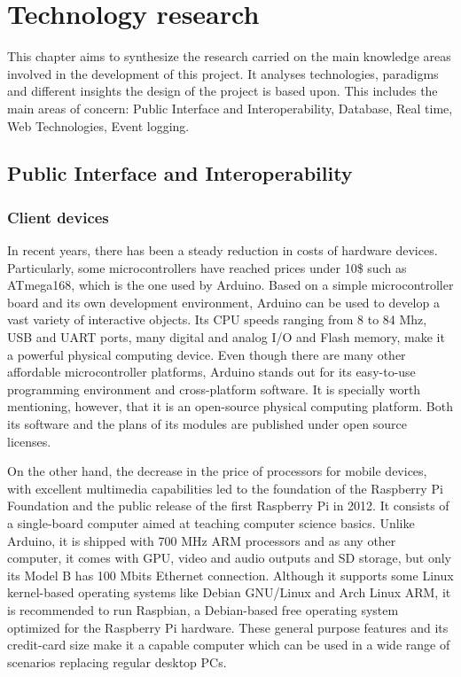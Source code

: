 \chapter{Technology research}

This chapter aims to synthesize the research carried on the main knowledge areas involved in the development of this project. It analyses technologies, paradigms and different insights the design of the project is based upon. This includes the main areas of concern: Public Interface and Interoperability, Database, Real time, Web Technologies, Event logging.   

\section{Public Interface and Interoperability}

\subsection{Client devices}

In recent years, there has been a steady reduction in costs of hardware devices. Particularly, some microcontrollers have reached prices under 10\$ such as ATmega168, which is the one used by Arduino. Based on a simple microcontroller board and its own development environment, Arduino can be used to develop a vast variety of interactive objects. Its CPU speeds ranging from 8 to 84 Mhz, USB and UART ports, many digital and analog I/O and Flash memory, make it a powerful physical computing device. Even though there are many other affordable microcontroller platforms, Arduino stands out for its easy-to-use programming environment and cross-platform software. It is specially worth mentioning, however, that it is an open-source physical computing platform. Both its software and the plans of its modules are published under open source licenses.

On the other hand, the decrease in the price of processors for mobile devices, with excellent multimedia capabilities led to the foundation of the Raspberry Pi Foundation and the public release of the first Raspberry Pi in 2012. It consists of a single-board computer aimed at teaching computer science basics. Unlike Arduino, it is shipped with 700 MHz ARM processors and as any other computer, it comes with GPU, video and audio outputs and SD storage, but only its Model B has 100 Mbits Ethernet connection. Although it supports some Linux kernel-based operating systems like Debian GNU/Linux and Arch Linux ARM, it is recommended to run Raspbian, a Debian-based free operating system optimized for the Raspberry Pi hardware. These general purpose features and its credit-card size make it a capable computer which can be used in a wide range of scenarios replacing regular desktop PCs.

